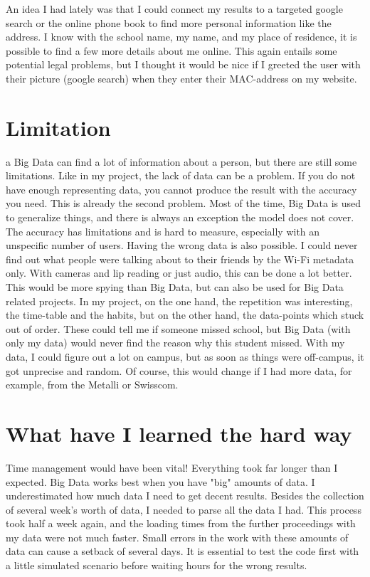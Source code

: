 \documentclass[paper=a4, fontsize=11pt]{article}
\begin{document}
An idea I had lately was that I could connect my results to a targeted google search or the online phone book to find more personal information like the address. I know with the school name, my name, and my place of residence, it is possible to find a few more details about me online. This again entails some potential legal problems, but I thought it would be nice if I greeted the user with their picture (google search) when they enter their MAC-address on my website.



\section{Limitation}a
Big Data can find a lot of information about a person, but there are still some limitations. Like in my project, the lack of data can be a problem. If you do not have enough representing data, you cannot produce the result with the accuracy you need. This is already the second problem. Most of the time, Big Data is used to generalize things, and there is always an exception the model does not cover. The accuracy has limitations and is hard to measure, especially with an unspecific number of users. Having the wrong data is also possible. I could never find out what people were talking about to their friends by the Wi-Fi metadata only. With cameras and lip reading or just audio, this can be done a lot better. This would be more spying than Big Data, but can also be used for Big Data related projects. In my project, on the one hand, the repetition was interesting, the time-table and the habits, but on the other hand, the data-points which stuck out of order. These could tell me if someone missed school, but Big Data (with only my data) would never find the reason why this student missed. With my data, I could figure out a lot on campus, but as soon as things were off-campus, it got unprecise and random. Of course, this would change if I had more data, for example, from the Metalli or Swisscom.

\section{What have I learned the hard way}
Time management would have been vital! Everything took far longer than I expected. Big Data works best when you have "big" amounts of data. I underestimated how much data I need to get decent results. Besides the collection of several week's worth of data, I needed to parse all the data I had. This process took half a week again, and the loading times from the further proceedings with my data were not much faster. Small errors in the work with these amounts of data can cause a setback of several days. It is essential to test the code first with a little simulated scenario before waiting hours for the wrong results.
\end{document}
